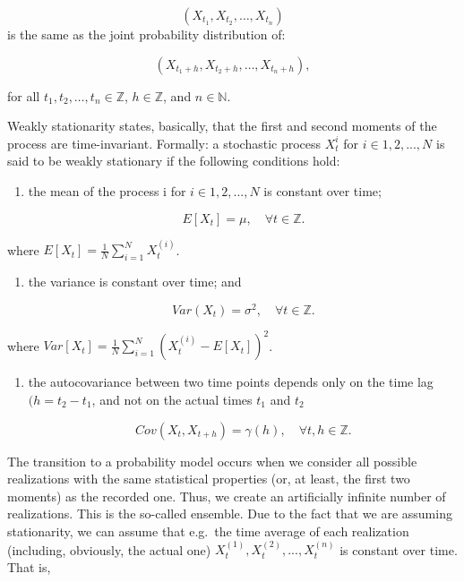 \documentclass[
]{article}
\begin{document}
\[
(X_{t_1}, X_{t_2}, \dots, X_{t_n})
\] is the same as the joint probability distribution of:

\[
(X_{t_1+h}, X_{t_2+h}, \dots, X_{t_n+h}),
\]

for all \(t_1, t_2, \dots, t_n \in \mathbb{Z}\), \(h \in \mathbb{Z}\),
and \(n \in \mathbb{N}\).

Weakly stationarity states, basically, that the first and second moments
of the process are time-invariant. Formally: a stochastic process
\({X_t^{i}}\) for \(i \in {1, 2, ..., N}\) is said to be weakly
stationary if the following conditions hold:

\begin{enumerate}
\def\labelenumi{(\arabic{enumi})}
\item
  the mean of the process i for \(i \in {1, 2, ..., N}\) is constant
  over time;

  \[
  E[X_t] = \mu, \quad \forall t \in \mathbb{Z}.
  \]
\end{enumerate}

where \(E[X_t] = \frac{1}{N} \sum_{i=1}^{N} X_t^{(i)}\).

\begin{enumerate}
\def\labelenumi{(\arabic{enumi})}
\setcounter{enumi}{1}
\item
  the variance is constant over time; and

  \[
  Var(X_t) = \sigma^2, \quad \forall t \in \mathbb{Z}.
  \]
\end{enumerate}

where \(Var[X_t] = \frac{1}{N} \sum_{i=1}^{N} (X_t^{(i)} - E[X_t])^2\).

\begin{enumerate}
\def\labelenumi{(\arabic{enumi})}
\setcounter{enumi}{2}
\item
  the autocovariance between two time points depends only on the time
  lag \((h = t_2 - t_1\), and not on the actual times \(t_1\) and
  \(t_2\)

  \[
  Cov(X_t, X_{t+h}) = \gamma(h), \quad \forall t, h \in \mathbb{Z}.
  \]
\end{enumerate}

The transition to a probability model occurs when we consider all
possible realizations with the same statistical properties (or, at
least, the first two moments) as the recorded one. Thus, we create an
artificially infinite number of realizations. This is the so-called
ensemble. Due to the fact that we are assuming stationarity, we can
assume that e.g.~the time average of each realization (including,
obviously, the actual one)
\({X_t^{(1)}}, {X_t^{(2)}}, ..., {X_t^{(n)}}\) is constant over time.
That is,
\end{document}
